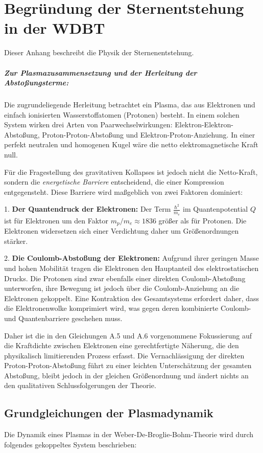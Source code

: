 \chapter{Begründung der Sternentstehung in der WDBT}
\label{app:sternentstehung}
Dieser Anhang beschreibt die Physik der Sternenentstehung.

\paragraph{Zur Plasmazusammensetzung und der Herleitung der Abstoßungsterme:}
Die zugrundeliegende Herleitung betrachtet ein Plasma, das aus Elektronen und einfach ionisierten Wasserstoffatomen (Protonen) besteht. In einem solchen System wirken drei Arten von
Paarwechselwirkungen: Elektron-Elektron-Abstoßung, Proton-Proton-Abstoßung und Elektron-Proton-Anziehung. In einer perfekt neutralen und homogenen Kugel wäre die netto elektromagnetische Kraft null.

Für die Fragestellung des gravitativen Kollapses ist jedoch nicht die Netto-Kraft, sondern die \textit{energetische Barriere} entscheidend, die einer Kompression entgegensteht. Diese Barriere wird
maßgeblich von zwei Faktoren dominiert:

1.  \textbf{Der Quantendruck der Elektronen:} Der Term $\frac{\hbar^2}{m_e}$ im Quantenpotential $Q$ ist für Elektronen um den Faktor $m_p/m_e \approx 1836$ größer als für Protonen. Die Elektronen widersetzen sich einer Verdichtung daher um Größenordnungen stärker.

2.  \textbf{Die Coulomb-Abstoßung der Elektronen:} Aufgrund ihrer geringen Masse und hohen Mobilität tragen die Elektronen den Hauptanteil des elektrostatischen Drucks. Die Protonen sind zwar ebenfalls einer direkten Coulomb-Abstoßung unterworfen, ihre Bewegung ist jedoch über die Coulomb-Anziehung an die Elektronen gekoppelt. Eine Kontraktion des Gesamtsystems erfordert daher, dass die Elektronenwolke komprimiert wird, was gegen deren kombinierte Coulomb- und Quantenbarriere geschehen muss.

Daher ist die in den Gleichungen A.5 und A.6 vorgenommene Fokussierung auf die Kraftdichte zwischen Elektronen eine gerechtfertigte Näherung, die den physikalisch limitierenden Prozess erfasst. Die
Vernachlässigung der direkten Proton-Proton-Abstoßung führt zu einer leichten Unterschätzung der gesamten Abstoßung, bleibt jedoch in der gleichen Größenordnung und ändert nichts an den qualitativen
Schlussfolgerungen der Theorie.

\section{Grundgleichungen der Plasmadynamik}
Die Dynamik eines Plasmas in der Weber-De-Broglie-Bohm-Theorie wird durch folgendes gekoppeltes System beschrieben:

